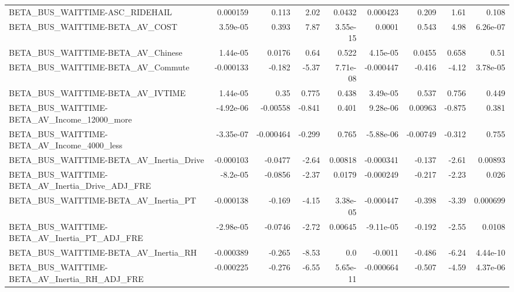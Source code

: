 \begin{tabular}{lrrrrrrrr}
BETA\_BUS\_WAITTIME-ASC\_RIDEHAIL                     &    0.000159 &        0.113 &     2.02 &   0.0432 &   0.000423 &       0.209 &         1.61 &         0.108 \\
BETA\_BUS\_WAITTIME-BETA\_AV\_COST                     &    3.59e-05 &        0.393 &     7.87 & 3.55e-15 &     0.0001 &       0.543 &         4.98 &      6.26e-07 \\
BETA\_BUS\_WAITTIME-BETA\_AV\_Chinese                  &    1.44e-05 &       0.0176 &     0.64 &    0.522 &   4.15e-05 &      0.0455 &        0.658 &          0.51 \\
BETA\_BUS\_WAITTIME-BETA\_AV\_Commute                  &   -0.000133 &       -0.182 &    -5.37 & 7.71e-08 &  -0.000447 &      -0.416 &        -4.12 &      3.78e-05 \\
BETA\_BUS\_WAITTIME-BETA\_AV\_IVTIME                   &    1.44e-05 &         0.35 &    0.775 &    0.438 &   3.49e-05 &       0.537 &        0.756 &         0.449 \\
BETA\_BUS\_WAITTIME-BETA\_AV\_Income\_12000\_more        &   -4.92e-06 &     -0.00558 &   -0.841 &    0.401 &   9.28e-06 &     0.00963 &       -0.875 &         0.381 \\
BETA\_BUS\_WAITTIME-BETA\_AV\_Income\_4000\_less         &   -3.35e-07 &    -0.000464 &   -0.299 &    0.765 &  -5.88e-06 &    -0.00749 &       -0.312 &         0.755 \\
BETA\_BUS\_WAITTIME-BETA\_AV\_Inertia\_Drive            &   -0.000103 &      -0.0477 &    -2.64 &  0.00818 &  -0.000341 &      -0.137 &        -2.61 &       0.00893 \\
BETA\_BUS\_WAITTIME-BETA\_AV\_Inertia\_Drive\_ADJ\_FRE    &    -8.2e-05 &      -0.0856 &    -2.37 &   0.0179 &  -0.000249 &      -0.217 &        -2.23 &         0.026 \\
BETA\_BUS\_WAITTIME-BETA\_AV\_Inertia\_PT               &   -0.000138 &       -0.169 &    -4.15 & 3.38e-05 &  -0.000447 &      -0.398 &        -3.39 &      0.000699 \\
BETA\_BUS\_WAITTIME-BETA\_AV\_Inertia\_PT\_ADJ\_FRE       &   -2.98e-05 &      -0.0746 &    -2.72 &  0.00645 &  -9.11e-05 &      -0.192 &        -2.55 &        0.0108 \\
BETA\_BUS\_WAITTIME-BETA\_AV\_Inertia\_RH               &   -0.000389 &       -0.265 &    -8.53 &      0.0 &    -0.0011 &      -0.486 &        -6.24 &      4.44e-10 \\
BETA\_BUS\_WAITTIME-BETA\_AV\_Inertia\_RH\_ADJ\_FRE       &   -0.000225 &       -0.276 &    -6.55 & 5.65e-11 &  -0.000664 &      -0.507 &        -4.59 &      4.37e-06 \\

\end{tabular}
